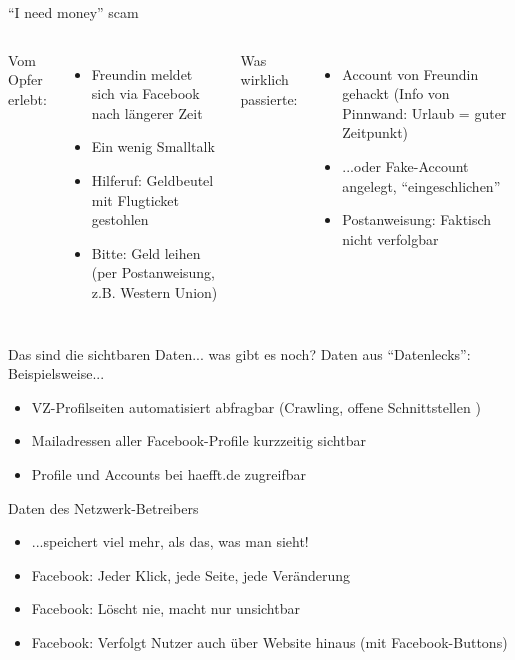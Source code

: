 \begin{frame}{"`I need money"' scam}
	\begin{columns}[t]
		Vom Opfer erlebt:
		\begin{itemize}
			\item Freundin meldet sich via Facebook nach längerer Zeit
			\item Ein wenig Smalltalk
			\item<2-> Hilferuf: Geldbeutel mit Flugticket gestohlen
			\item<2-> Bitte: Geld leihen (per Postanweisung, z.B. Western Union)
		\end{itemize}
		Was wirklich passierte:
		\begin{itemize}
			\item<3-> Account von Freundin gehackt (Info von Pinnwand: Urlaub = guter Zeitpunkt)
			\item<3-> ...oder Fake-Account angelegt, "`eingeschlichen"'
			\item<3-> Postanweisung: Faktisch nicht verfolgbar
		\end{itemize}
	\end{columns}
\end{frame}

\begin{frame}{Das sind die sichtbaren Daten... was gibt es noch?}
	Daten aus "`Datenlecks"': Beispielsweise...
	\begin{itemize}
		\item VZ-Profilseiten automatisiert abfragbar (Crawling, offene Schnittstellen%
		)
		\item Mailadressen aller Facebook-Profile kurzzeitig sichtbar%
		\item Profile und Accounts bei haefft.de zugreifbar%
	\end{itemize}

	Daten des Netzwerk-Betreibers
	\begin{itemize}
		\item ...speichert viel mehr, als das, was man sieht!
		\item Facebook: Jeder Klick, jede Seite, jede Veränderung%
		\item Facebook: Löscht nie, macht nur unsichtbar
		\item Facebook: Verfolgt Nutzer auch über Website hinaus (mit Facebook-Buttons)
	\end{itemize}
\end{frame}

